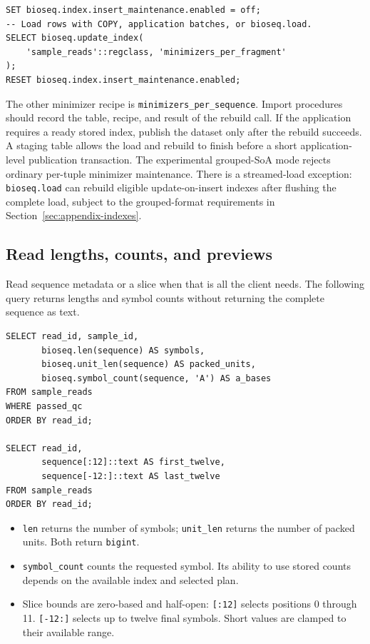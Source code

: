 \par\noindent\begin{minipage}{\linewidth}
\begin{lstlisting}[style=bioseq-appendix-sql]
SET bioseq.index.insert_maintenance.enabled = off;
-- Load rows with COPY, application batches, or bioseq.load.
SELECT bioseq.update_index(
    'sample_reads'::regclass, 'minimizers_per_fragment'
);
RESET bioseq.index.insert_maintenance.enabled;
\end{lstlisting}
\end{minipage}

The other minimizer recipe is \texttt{minimizers\_per\_sequence}. Import
procedures should record the table, recipe, and result of the rebuild call.
If the application requires a ready stored index, publish the dataset only
after the rebuild succeeds. A staging table allows the load and rebuild to
finish before a short application-level publication transaction. The
experimental grouped-SoA mode rejects ordinary per-tuple minimizer
maintenance. There is a streamed-load exception: \texttt{bioseq.load} can
rebuild eligible update-on-insert indexes after flushing the complete load,
subject to the grouped-format requirements in
Section~\ref{sec:appendix-indexes}.

\subsection{Read lengths, counts, and previews}

Read sequence metadata or a slice when that is all the client needs. The
following query returns lengths and symbol counts without returning the
complete sequence as text.

\par\noindent\begin{minipage}{\linewidth}
\begin{lstlisting}[style=bioseq-appendix-sql]
SELECT read_id, sample_id,
       bioseq.len(sequence) AS symbols,
       bioseq.unit_len(sequence) AS packed_units,
       bioseq.symbol_count(sequence, 'A') AS a_bases
FROM sample_reads
WHERE passed_qc
ORDER BY read_id;

SELECT read_id,
       sequence[:12]::text AS first_twelve,
       sequence[-12:]::text AS last_twelve
FROM sample_reads
ORDER BY read_id;
\end{lstlisting}
\end{minipage}

\begin{itemize}
  \item \texttt{len} returns the number of symbols; \texttt{unit\_len}
    returns the number of packed units. Both return \texttt{bigint}.
  \item \texttt{symbol\_count} counts the requested symbol. Its ability to
    use stored counts depends on the available index and selected plan.
  \item Slice bounds are zero-based and half-open: \texttt{[:12]} selects
    positions 0 through 11. \texttt{[-12:]} selects up to twelve final
    symbols. Short values are clamped to their available range.
\end{itemize}

